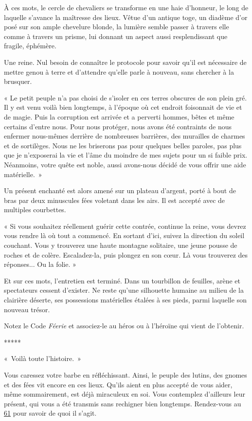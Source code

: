 \documentclass{report}
\newcommand{\glink}[1]{\hyperref[section-#1]{#1}}
\newcommand{\ellipse}{
    \begin{center}
        *****
    \end{center}
}
\begin{document}
À ces mots, le cercle de chevaliers se transforme en une haie d'honneur, le long de laquelle s'avance la maîtresse des lieux. Vêtue d'un antique toge, un diadème d'or posé sur son ample chevelure blonde, la lumière semble passer à travers elle comme à travers un prisme, lui donnant un aspect aussi resplendissant que fragile, éphémère.

Une reine. Nul besoin de connaître le protocole pour savoir qu'il est nécessaire de mettre genou à terre et d'attendre qu'elle parle à nouveau, sans chercher à la brusquer.

« Le petit peuple n'a pas choisi de s'isoler en ces terres obscures de son plein gré. Il y est venu voilà bien longtemps, à l'époque où cet endroit foisonnait de vie et de magie. Puis la corruption est arrivée et a perverti hommes, bêtes et même certains d'entre nous. Pour nous protéger, nous avons été contraints de nous enfermer nous-mêmes derrière de nombreuses barrières, des murailles de charmes et de sortilèges. Nous ne les briserons pas pour quelques belles paroles, pas plus que je n'exposerai la vie et l'âme du moindre de mes sujets pour un si faible prix. Néanmoins, votre quête est noble, aussi avons-nous décidé de vous offrir une aide matérielle. »

Un présent enchanté est alors amené sur un plateau d'argent, porté à bout de bras par deux minuscules fées voletant dans les airs. Il est accepté avec de multiples courbettes.

« Si vous souhaitez réellement guérir cette contrée, continue la reine, vous devrez vous rendre là où tout a commencé. En sortant d'ici, suivez la direction du soleil couchant. Vous y trouverez une haute montagne solitaire, une jeune pousse de roches et de colère. Escaladez-la, puis plongez en son cœur. Là vous trouverez des réponses... Ou la folie. »

Et sur ces mots, l'entretien est terminé. Dans un tourbillon de feuilles, arène et spectateurs cessent d'exister. Ne reste qu'une silhouette humaine au milieu de la clairière déserte, ses possessions matérielles étalées à ses pieds, parmi laquelle son nouveau trésor.

Notez le Code \emph{Féerie} et associez-le au héros ou à l'héroïne qui vient de l'obtenir.

\ellipse

« Voilà toute l'histoire. »

Vous caressez votre barbe en réfléchissant. Ainsi, le peuple des lutins, des gnomes et des fées vit encore en ces lieux. Qu'ils aient en plus accepté de vous aider, même sommairement, est déjà miraculeux en soi. Vous contemplez d'ailleurs leur présent, qui vous a été transmis sans rechigner bien longtemps. Rendez-vous au \glink{61} pour savoir de quoi il s'agit.
\end{document}
